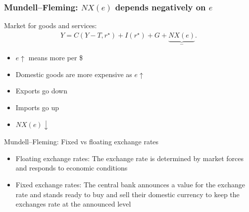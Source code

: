 \documentclass[presentation,dvipsnames]{beamer}
\renewcommand{\pounds}{\text{\textsterling}{ }}
\begin{document}

\begin{frame}
\frametitle{Mundell--Fleming: $NX(e)$ depends negatively on $e$}
Market for goods and services:
\begin{align*}
Y = C(Y-T, r^{\star})  + I(r^{\star}) + G + \underbrace{NX(e)}_{-}.
\end{align*}
\begin{itemize}[label={--}]
\item $e \uparrow$ means more \pounds per \$
\item Domestic goods are more expensive as $e \uparrow$
\item Exports go down
\item Imports go up
\item $NX(e) \downarrow$
\end{itemize}
\end{frame}

\begin{frame}[label=sec-6-3]{Mundell--Fleming: Fixed vs floating exchange rates}
\begin{itemize}[label={--}]
\item Floating exchange rates: The exchange rate is determined by market forces and responds to economic conditions
\item Fixed exchange rates: The central bank announces a value for the exchange rate and stands ready to buy and sell their domestic currency to keep the exchanges rate at the announced level
\end{itemize}
\end{frame}

\end{document}
